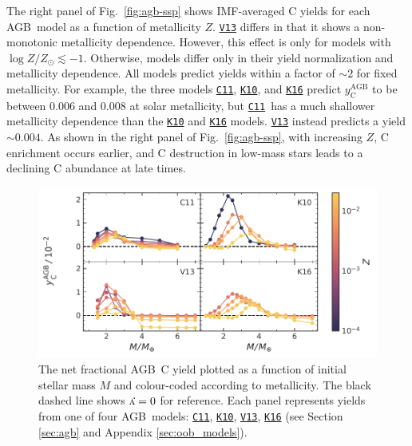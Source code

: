 \documentclass[fleqn,usenatbib]{mnras}
\newcommand{\cxi}{\texttt{\hyperlink{C11}{C11}}}
\newcommand{\kx}{\texttt{\hyperlink{K10}{K10}}}
\newcommand{\kxvi}{\texttt{\hyperlink{K16}{K16}}}
\newcommand{\vxiii}{\texttt{\hyperlink{V13}{V13}}}
\newcommand{\agb}{AGB}
\newcommand{\imf}{IMF}
\newcommand{\y}{\ensuremath{\rotatebox[origin=B,y=0.5ex]{180}{y}}}
\newcommand{\about}[1]{${\sim} #1$}
\begin{document}
The right panel of Fig.~\ref{fig:agb-ssp} shows \imf-averaged C yields for each \agb\ model as a function of metallicity $Z$.
\vxiii{} differs in that it shows a non-monotonic metallicity dependence. However, this effect is only for models with $\log Z/Z_\odot \lesssim -1$.
Otherwise, models differ only in their yield normalization and metallicity dependence. All models predict yields within a factor of \about{2} for fixed metallicity.
For example, the three models \cxi, \kx{}, and \kxvi{} predict $y_\text{C}^\text{AGB}$ to be between 0.006 and 0.008 at solar metallicity, but \cxi\ has a much shallower metallicity dependence than the \kx{} and \kxvi{} models. \vxiii{} instead predicts a yield \about{0.004}.
    As shown in the right panel of Fig.~\ref{fig:agb-ssp}, with increasing $Z$, C enrichment occurs earlier, and C destruction in low-mass stars leads to a declining C abundance at late times.




\begin{figure}
    \centering
 	    \includegraphics[scale=1]{agb_yields.pdf}
        \caption[]{The net fractional \agb\ C yield  plotted as a function of initial stellar mass $M$ and colour-coded according to metallicity. The black dashed line shows $\y=0$ for reference. Each panel represents yields from one of four \agb\ models: \cxi, \kx{}, \vxiii{}, \kxvi{} (see Section \ref{sec:agb} and  Appendix \ref{sec:oob_models}). }
        \label{fig:y_agb}
\end{figure}
\end{document}
